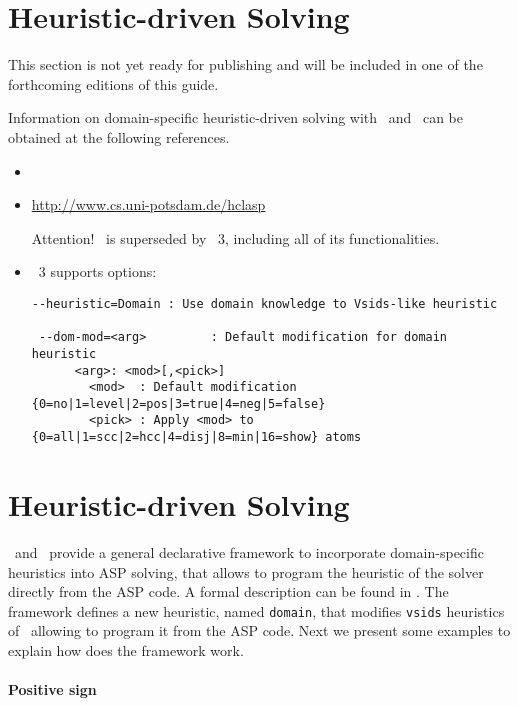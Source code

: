 

\section{Heuristic-driven Solving}

This section is not yet ready for publishing
and will be included in one of the forthcoming editions of this guide.

Information on domain-specific heuristic-driven solving with \clasp\ and \clingo\ can be obtained at the following references.

\begin{itemize}
\item \cite{gekaotroscwa13a}
\item \url{http://www.cs.uni-potsdam.de/hclasp}


  Attention! \hclasp\ is superseded by \clasp~3,
  including all of its functionalities.
\item \clasp~3 supports options:
\scriptsize\begin{lstlisting}[numbers=none]
 --heuristic=Domain : Use domain knowledge to Vsids-like heuristic

 --dom-mod=<arg>         : Default modification for domain heuristic
      <arg>: <mod>[,<pick>]
        <mod>  : Default modification {0=no|1=level|2=pos|3=true|4=neg|5=false}
        <pick> : Apply <mod> to {0=all|1=scc|2=hcc|4=disj|8=min|16=show} atoms
\end{lstlisting}
\end{itemize}


\section{Heuristic-driven Solving}
\label{sec:heuristic}


\clasp\ and \clingo\ provide a general declarative framework to incorporate domain-specific heuristics into ASP solving,  
that allows to program the heuristic of the solver directly from the ASP code. 
A formal description can be found in \cite{gekaotroscwa13a}.
The framework defines a new heuristic, named \texttt{domain},  
that modifies \texttt{vsids} heuristics of \clasp\ allowing to program it from the ASP code.  
Next we present some examples to explain how does the framework work. 

\paragraph{Positive sign}

